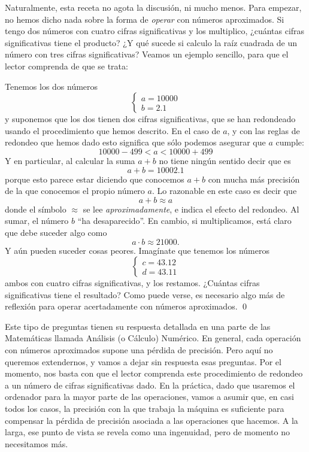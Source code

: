 Naturalmente, esta receta no agota la discusión, ni mucho menos. Para empezar, no hemos dicho nada sobre la forma de {\em operar} con números aproximados. Si tengo dos números con cuatro cifras significativas y los multiplico, ¿cuántas cifras significativas tiene el producto? ¿Y qué sucede si calculo la raíz cuadrada de un número con tres cifras significativas?  Veamos un ejemplo sencillo, para que el lector comprenda de que se trata:
\begin{ejemplo}
Tenemos los dos números
\[\begin{cases}
a= 10000\\
b= 2.1
\end{cases}\]
y suponemos que los dos tienen dos cifras significativas, que se han redondeado usando el procedimiento que hemos descrito. En el caso de $a$, y con las reglas de redondeo que hemos dado esto significa que sólo podemos asegurar que $a$ cumple:
\[10000-499< a < 10000+499 \]
Y en particular, al calcular la suma $a+b$ no tiene ningún sentido decir que es
\[a+b=10002.1\]
porque esto parece estar diciendo que conocemos $a+b$ con mucha más precisión de la que conocemos el propio número $a$. Lo razonable en este caso es decir que
\[a+b\approx a\]
donde el símbolo $\approx$ se lee {\em aproximadamente}, e indica el efecto del redondeo. Al sumar, el número $b$ ``ha desaparecido''. En cambio, si multiplicamos, está claro que debe suceder algo como
\[a\cdot b\approx 21000.\]
Y aún pueden suceder cosas peores. Imagínate que tenemos los números
\[\begin{cases}
c= 43.12\\
d= 43.11
\end{cases}\]
ambos con cuatro cifras significativas, y los restamos. ¿Cuántas cifras significativas tiene el resultado? Como puede verse, es necesario algo más de reflexión para operar acertadamente con números aproximados.
\qed
\end{ejemplo}
Este tipo de preguntas tienen su respuesta detallada en una parte de las Matemáticas llamada {\sf Análisis (o Cálculo) Numérico}. En general, cada operación con números aproximados supone una pérdida de precisión. Pero aquí no queremos extendernos, y vamos a dejar sin respuesta esas preguntas. Por el momento, nos basta con que el lector comprenda este procedimiento de redondeo a un número de cifras significativas dado. En la práctica, dado que usaremos el ordenador para la mayor parte de las operaciones, vamos a asumir que, en casi todos los casos, la precisión con la que trabaja la máquina es suficiente para compensar la pérdida de precisión asociada a las operaciones que hacemos. A la larga, ese punto de vista se revela como una ingenuidad, pero de momento no necesitamos más.

